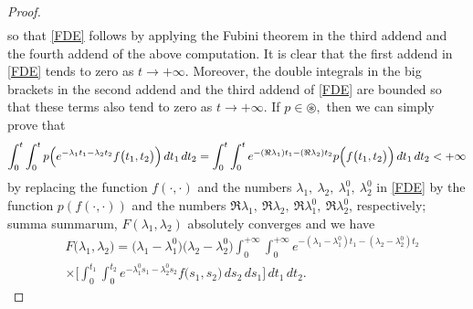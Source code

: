 \documentclass{amsart}
\theoremstyle{definition}
\theoremstyle{remark}
\numberwithin{equation}{section}
\begin{document}
\begin{proof}
\begin{align*}
\end{align*}
so that \eqref{FDE} follows by applying the Fubini theorem in the third addend and the fourth addend of the above computation. It is clear that the first addend in \eqref{FDE} tends to zero as $t\rightarrow +\infty.$ Moreover, the double integrals in the big brackets in the second addend and the third addend of \eqref{FDE} are bounded so that these terms also tend to zero as $t\rightarrow +\infty.$ If $p\in \circledast,$ then we can simply prove that{\small
$$
\int^{t}_{0}\int^{t}_{0}p\Bigl(e^{-\lambda_{1}t_{1}-\lambda_{2}t_{2}}f\bigl( t_{1},t_{2}\bigr)\Bigr)\, dt_{1}\, dt_{2}= \int^{t}_{0}\int^{t}_{0}e^{-(\Re \lambda_{1})t_{1}-(\Re \lambda_{2})t_{2}}p\Bigl(f\bigl( t_{1},t_{2}\bigr)\Bigr)\, dt_{1}\, dt_{2}<+\infty
$$}
by replacing the function $f(\cdot,\cdot)$ and the numbers $\lambda_{1},\ \lambda_{2},\ \lambda_{1}^{0},\ \lambda_{2}^{0}$ in \eqref{FDE} by the function $p(f(\cdot,\cdot))$ and the numbers $\Re\lambda_{1},\ \Re \lambda_{2},\ \Re \lambda_{1}^{0},\ \Re \lambda_{2}^{0}$, respectively; summa summarum, $F(\lambda_{1},\lambda_{2})$ absolutely converges and we have 
\begin{align*}
& F\bigl( \lambda_{1},\lambda_{2}\bigr)=\bigl( \lambda_{1}-\lambda_{1}^{0}\bigr)\bigl( \lambda_{2}-\lambda_{2}^{0}\bigr)
\int^{+\infty}_{0}\int^{+\infty}_{0}e^{-(\lambda_{1}-\lambda_{1}^{0})t_{1}-(\lambda_{2}-\lambda_{2}^{0})t_{2}}
\\& \times \Biggl[ \int^{t_{1}}_{0}\int^{t_{2}}_{0}e^{-\lambda_{1}^{0}s_{1}-\lambda_{2}^{0}s_{2}}f\bigl( s_{1},s_{2}\bigr) \, ds_{2}\, ds_{1} \Biggr]\, dt_{1}\, dt_{2}.
\end{align*}


\end{proof}
\end{document}
